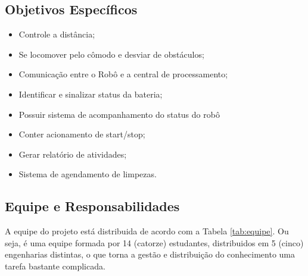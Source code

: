 
\subsection{Objetivos Específicos} %
\label{sub:objetivos_específicos}
	
	\begin{itemize}
		\item Controle a distância;
		\item Se locomover pelo cômodo e desviar de obstáculos;
		\item Comunicação entre o Robô e a central de processamento;
		\item Identificar e sinalizar status da bateria;
		\item Possuir sistema de acompanhamento do status do robô
		\item Conter acionamento de start/stop;
		\item Gerar relatório de atividades;
		\item Sistema de agendamento de limpezas.
	\end{itemize}

\subsection{Equipe e Responsabilidades} %
\label{sub:equipe_e_responsabilidades}

	A equipe do projeto está distribuida de acordo com a Tabela \ref{tab:equipe}. Ou seja, é uma equipe formada por 14 (catorze) estudantes, distribuidos em 5 (cinco) engenharias distintas, o que torna a gestão e distribuição do conhecimento uma tarefa bastante complicada.

